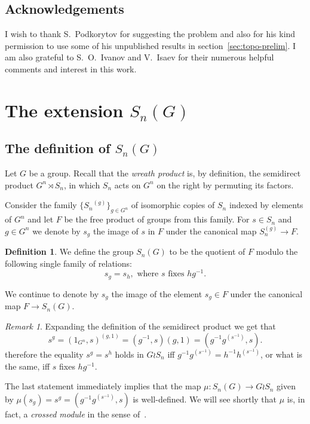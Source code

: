 \documentclass[oneside, 12pt]{amsart}
\theoremstyle{plain}
\numberwithin{equation}{section}
\numberwithin{lemma}{section}
\theoremstyle{remark}
\newtheorem{rem}[lemma]{Remark}
\theoremstyle{definition}
\newtheorem{df}[lemma]{Definition} \Crefname{df}{Definition}{Definitions}
\begin{document}
\subsection{Acknowledgements}
I wish to thank S.~Podkorytov for suggesting the problem and also for his kind permission 
 to use some of his unpublished results in section~\ref{sec:topo-prelim}.
I am also grateful to S.~O.~Ivanov and V.~Isaev for their numerous helpful comments and interest in this work.

\section{The extension $S_n(G)$} 
\subsection{The definition of $S_n(G)$} \label{sec:QnG-def}
Let $G$ be a group. Recall that the {\it wreath product} is, by definition,
 the semidirect product $G^n \rtimes S_n$, in which $S_n$ acts on $G^n$ on the right by permuting its factors.

Consider the family $\{{S_n}^{(g)}\}_{g\in G^n}$ of isomorphic copies of $S_n$ indexed by elements of $G^n$ and let $F$ be the free product of groups from this family.
For $s\in S_n$ and $g\in G^n$ we denote by 
$s_{g}$ the image of $s$ in $F$ under the canonical map $S_n^{(g)} \to F$.

\begin{df} We define the group $S_n(G)$ to be the quotient of $F$ modulo the following single family of relations:
\begin{equation} \label{eq:main_rel} s_g = s_h, \text{ where $s$ fixes $h g^{-1}$.} \end{equation} \end{df}

We continue to denote by $s_g$ the image of the element $s_g\in F$ under the canonical map $F\to S_n(G)$.

\begin{rem}
Expanding the definition of the semidirect product we get that
\begin{equation} \nonumber s^g = (1_{G^n}, s)^{(g, 1)} = (g^{-1}, s) (g, 1) = (g^{-1} g^{(s^{-1})}, s). \end{equation}
therefore the equality $s^g = s^h$ holds in $G \wr S_n$ iff
$g^{-1} g^{(s^{-1})} = h^{-1} h^{(s^{-1})}$, or what is the same, iff $s$ fixes $hg^{-1}$.

The last statement immediately implies that the map $\mu \colon S_n(G) \to G \wr S_n$ given by $\mu(s_g) = s^g = (g^{-1}g^{(s^{-1})}, s)$
is well-defined. We will see shortly that $\mu$ is, in fact, a {\it crossed module} in the sense of~\cite[\S~2.2]{BHS11}.
\end{rem}
\end{document}
